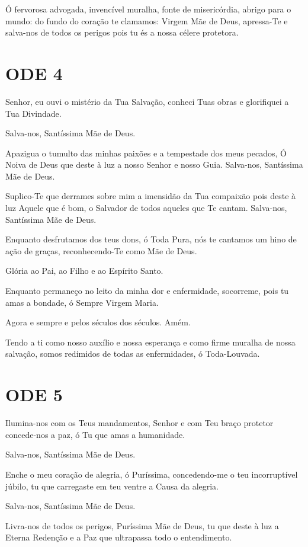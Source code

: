 \documentclass{subfiles}
\begin{document}
Ó fervorosa advogada, invencível muralha, fonte de misericórdia, abrigo para o
mundo: do fundo do coração te clamamos: Virgem Mãe de Deus, apressa-Te e
salva-nos de todos os perigos pois tu és a nossa célere protetora.

\section*{ODE 4}

\eirmos{}Senhor, eu ouvi o mistério da Tua Salvação, conheci Tuas obras
e glorifiquei a Tua Divindade.

Salva-nos, Santíssima Mãe de Deus.

Apazigua o tumulto das minhas paixões e a tempestade dos meus
pecados, Ó Noiva de Deus que deste à luz a nosso Senhor e nosso Guia.
Salva-nos, Santíssima Mãe de Deus.

Suplico-Te que derrames sobre mim a imensidão da Tua compaixão
pois deste à luz Aquele que é bom, o Salvador de todos aqueles que Te cantam.
Salva-nos, Santíssima Mãe de Deus.

Enquanto desfrutamos dos teus dons, ó Toda Pura, nós te cantamos
um hino de ação de graças, reconhecendo-Te como Mãe de Deus.

Glória ao Pai, ao Filho e ao Espírito Santo.

Enquanto permaneço no leito da minha dor e enfermidade, socorreme, pois tu amas
a bondade, ó Sempre Virgem Maria.

Agora e sempre e pelos séculos dos séculos. Amém.

Tendo a ti como nosso auxílio e nossa esperança e como firme muralha
de nossa salvação, somos redimidos de todas as enfermidades, ó Toda-Louvada.

\section*{ODE 5}

\eirmos{}Ilumina-nos com os Teus mandamentos, Senhor e com Teu
braço protetor concede-nos a paz, ó Tu que amas a humanidade.

Salva-nos, Santíssima Mãe de Deus.

Enche o meu coração de alegria, ó Puríssima, concedendo-me o teu
incorruptível júbilo, tu que carregaste em teu ventre a Causa da alegria.

Salva-nos, Santíssima Mãe de Deus.

Livra-nos de todos os perigos, Puríssima Mãe de Deus, tu que deste à
luz a Eterna Redenção e a Paz que ultrapassa todo o entendimento.
\end{document}
